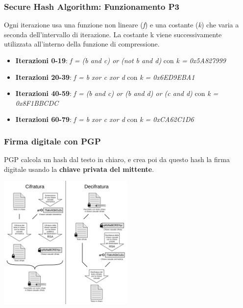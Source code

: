 \begin{frame}
\frametitle{Secure Hash Algorithm: Funzionamento P3}

Ogni iterazione usa una funzione non lineare (\textit{f}) e una costante (\textit{k}) che varia a seconda dell'intervallo di iterazione.
La costante k viene successivamente utilizzata all'interno della funzione di compressione.

\begin{itemize}
    \item \textbf{Iterazioni 0-19}: \textit{f = (b and c) or (not b and d)} con \textit{k = 0x5A827999}
    \item \textbf{Iterazioni 20-39}: \textit{f = b xor c xor d} con \textit{k = 0x6ED9EBA1}
    \item \textbf{Iterazioni 40-59}: \textit{f = (b and c) or (b and d) or (c and d)} con \textit{k = 0x8F1BBCDC}
    \item \textbf{Iterazioni 60-79}: \textit{f = b xor c xor d} con \textit{k = 0xCA62C1D6}
  \end{itemize}

\end{frame}

\begin{frame}
    \frametitle{Firma digitale con PGP}
PGP calcola un hash dal testo in chiaro, e crea poi da questo hash la firma digitale usando la  \textbf{chiave privata del mittente}.
\begin{center}
    \includegraphics[width=0.5\textwidth]{img/1-img/PGP_diagram_IT.png}
\end{center}
\end{frame}

